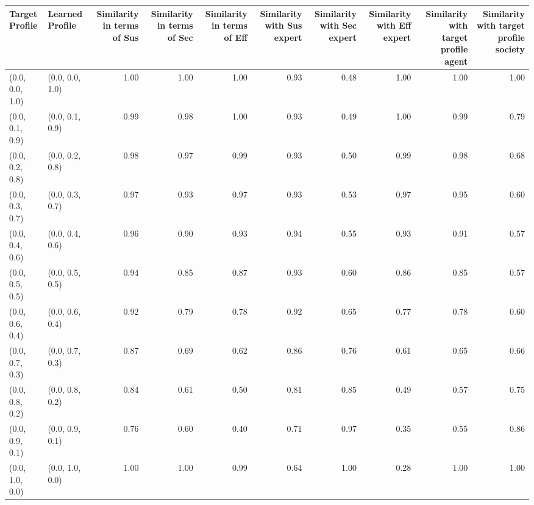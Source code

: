 \begin{tabular}{llrrrrrrrr}
\toprule
Target Profile & Learned Profile & Similarity in terms of Sus & Similarity in terms of Sec & Similarity in terms of Eff & Similarity with Sus expert & Similarity with Sec expert & Similarity with Eff expert & Similarity with target profile agent & Similarity with target profile society \\
\midrule
(0.0, 0.0, 1.0) & (0.0, 0.0, 1.0) & 1.00 & 1.00 & 1.00 & 0.93 & 0.48 & 1.00 & 1.00 & 1.00 \\
(0.0, 0.1, 0.9) & (0.0, 0.1, 0.9) & 0.99 & 0.98 & 1.00 & 0.93 & 0.49 & 1.00 & 0.99 & 0.79 \\
(0.0, 0.2, 0.8) & (0.0, 0.2, 0.8) & 0.98 & 0.97 & 0.99 & 0.93 & 0.50 & 0.99 & 0.98 & 0.68 \\
(0.0, 0.3, 0.7) & (0.0, 0.3, 0.7) & 0.97 & 0.93 & 0.97 & 0.93 & 0.53 & 0.97 & 0.95 & 0.60 \\
(0.0, 0.4, 0.6) & (0.0, 0.4, 0.6) & 0.96 & 0.90 & 0.93 & 0.94 & 0.55 & 0.93 & 0.91 & 0.57 \\
(0.0, 0.5, 0.5) & (0.0, 0.5, 0.5) & 0.94 & 0.85 & 0.87 & 0.93 & 0.60 & 0.86 & 0.85 & 0.57 \\
(0.0, 0.6, 0.4) & (0.0, 0.6, 0.4) & 0.92 & 0.79 & 0.78 & 0.92 & 0.65 & 0.77 & 0.78 & 0.60 \\
(0.0, 0.7, 0.3) & (0.0, 0.7, 0.3) & 0.87 & 0.69 & 0.62 & 0.86 & 0.76 & 0.61 & 0.65 & 0.66 \\
(0.0, 0.8, 0.2) & (0.0, 0.8, 0.2) & 0.84 & 0.61 & 0.50 & 0.81 & 0.85 & 0.49 & 0.57 & 0.75 \\
(0.0, 0.9, 0.1) & (0.0, 0.9, 0.1) & 0.76 & 0.60 & 0.40 & 0.71 & 0.97 & 0.35 & 0.55 & 0.86 \\
(0.0, 1.0, 0.0) & (0.0, 1.0, 0.0) & 1.00 & 1.00 & 0.99 & 0.64 & 1.00 & 0.28 & 1.00 & 1.00 \\
\bottomrule
\end{tabular}
